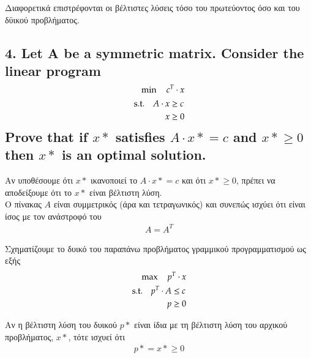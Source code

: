 \documentclass[12pt]{article}
\begin{document}
Διαφορετικά επιστρέφονται οι βέλτιστες λύσεις τόσο του πρωτεύοντος όσο και του δϋικού προβλήματος. \\

\vspace{2in}

\pagebreak

\subsection*{4. Let A be a symmetric matrix. Consider the linear program
	\begin{align*}
		\min \quad c^{T} \cdot x \\
		\begin{aligned}
	   		\textup{s.t.}\quad
			A \cdot x & \geq c \\
			x & \geq 0 
		\end{aligned}
	\end{align*}
	Prove that if \({x*}\) satisfies \(A \cdot {x*} = c\) and \({x*} \geq 0\) then \({x*}\) is an optimal solution.}

Αν υποθέσουμε ότι \({x*}\) ικανοποιεί το \(A \cdot {x*} = c\) και ότι \({x*} \geq 0\), πρέπει να αποδείξουμε ότι το \({x*}\) είναι βέλτιστη λύση. \\

Ο πίνακας \(A\) είναι συμμετρικός (άρα και τετραγωνικός) και συνεπώς ισχύει ότι είναι ίσος με τον ανάστροφό του\\

\begin{align*}
	A = A^{T}
\end{align*}

Σχηματίζουμε το δυικό του παραπάνω προβλήματος γραμμικού προγραμματισμού ως εξής \\

\begin{align*}
	\max \quad p^{T} \cdot x \\
	\begin{aligned}
		\textup{s.t.}\quad
		p^{T} \cdot A & \leq c \\
		p & \geq 0 
	\end{aligned}
\end{align*}

Αν η βέλτιστη λύση του δυικού \({p*}\) είναι ίδια με τη βέλτιστη λύση του αρχικού προβλήματος, \({x*}\), τότε ισχυεί ότι \\

\begin{align*}
	{p*} = {x*} \geq 0
\end{align*}
\end{document}
